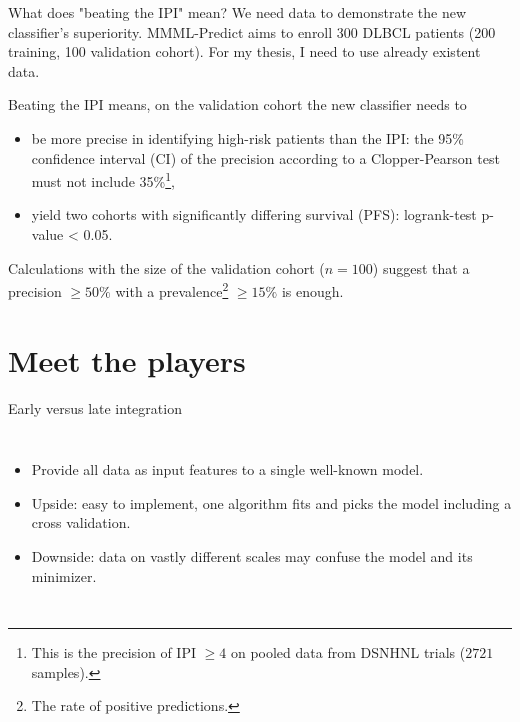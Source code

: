 \documentclass[10pt, aspectratio=169]{beamer}
\begin{document}
\begin{frame}{What does "beating the IPI" mean?}
  We need data to demonstrate the new classifier's superiority. MMML-Predict aims to enroll 300 DLBCL 
  patients (200 training, 100 validation cohort). For my thesis, I need to use already existent data.

  \pause
  Beating the IPI means, on the validation cohort the new classifier needs to 

  \begin{itemize}
    \item be \alert{more precise in identifying high-risk patients} than the IPI: the 95\% confidence interval (CI) 
    of the precision according to a Clopper-Pearson test 
    must not include 35\%\footnote{This is the  precision of IPI $\geq 4$ on pooled data from DSNHNL trials 
    ($\num{2721}$ samples).},
    \item yield \alert{two cohorts with significantly differing survival} (PFS): logrank-test p-value < 0.05.
  \end{itemize}

  \pause
  Calculations with the size of the validation cohort ($n = 100$) suggest that a precision $\geq 50\%$ with a 
  prevalence\footnote{The rate of positive predictions.} $\geq 15\%$ is enough.
\end{frame}

\section{Meet the players}

\begin{frame}{\alert{Early} versus late integration}
  \begin{columns}
      \centering
      \begin{itemize}
        \item Provide all data as input features to a single well-known model.
        \item Upside: easy to implement, one algorithm fits and picks the model 
          including a cross validation.
        \item Downside: data on vastly different scales may confuse the model and 
          its minimizer.
      \end{itemize}
  \end{columns}
\end{frame}
\end{document}
